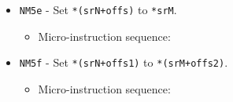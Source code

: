 \documentclass{article}
\def\specialtoaddr#1{\Verb|#1102| - output \Verb|sr#1| to addr bus}
\def\pkptrout{\Verb|0202| - output *\Verb|pk| to data bus}
\def\datatooffs{\Verb|4402| - write to \Verb|offs| from data bus}
\def\incrementpk{\Verb|0502| - increment \Verb|pk|}
\def\writeRAMo{\Verb|0104| - write data bus to *(addr bus+\Verb|offs|)}
\def\echodatalong{\Verb|0025| - echo data bus to itself for 3 cycles}
\def\done{\Verb|fffe| - end instruction}
\begin{document}
\begin{itemize}
    \item \Verb|NM5e| - Set \Verb|*(srN+offs)| to \Verb|*srM|.
    \begin{itemize}
        \item Micro-instruction sequence:
    \end{itemize}
    
    \item \Verb|NM5f| - Set \Verb|*(srN+offs1)| to \Verb|*(srM+offs2)|.
    \begin{itemize}
        \item Micro-instruction sequence:
    \end{itemize}
\end{itemize}
\end{document}
